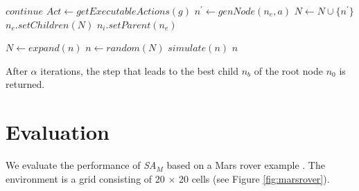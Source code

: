 \documentclass[portrait, plainsections]{sciposter}
\newcommand{\SAM}{\emph{SA}$_M$\xspace}
\begin{document}
\begin{multicols}{3}
\begin{description}
\begin{shaded}
\begin{algorithmic}
      \EndIf
        \State $continue$
      \EndIf
        \State $Act \gets getExecutableActions(g)$
            \State $n^{\prime} \gets genNode(n_e, a)$
            \State $N \gets N \cup \{n^{\prime}\}$
          \EndFor
      \EndIf
    \EndFor
    \State $n_e.setChildren(N)$
    \State $n_i.setParent(n_e)$
    \EndFor
    
    \EndFunction
  \end{algorithmic}
\end{shaded}

\begin{shaded}
  \begin{algorithmic}
      \State $N \gets expand(n)$
        \State $n \gets random(N)$
        \State $simulate(n)$
      \EndIf
      \Return $n$
    \EndFunction
  \end{algorithmic}
\end{shaded}

\begin{figure}[H]
\end{figure}
\end{description}

After $\alpha$ iterations, the step that leads to the best child $n_{b}$ of the root node $n_0$ is returned.

\section*{Evaluation}

We evaluate the performance of \SAM based on a Mars rover example \cite{DuffHT06}. The environment is a grid consisting of 20 $\times$ 20 cells (see Figure \ref{fig:marsrover}).


\end{multicols}
\end{document}
